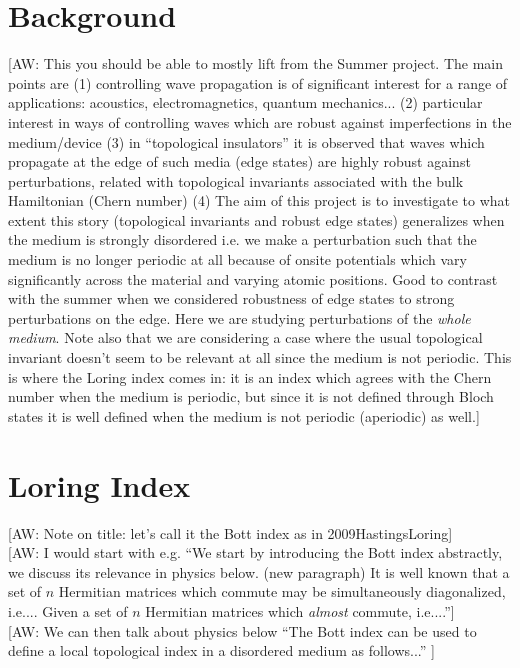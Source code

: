 \documentclass[a4paper]{article}
\newcommand{\aw}[1]{{\color{blue} [AW: #1]}}
\begin{document}
\section{Background}
\aw{This you should be able to mostly lift from the Summer project. The main points are (1) controlling wave propagation is of significant interest for a range of applications: acoustics, electromagnetics, quantum mechanics... (2) particular interest in ways of controlling waves which are robust against imperfections in the medium/device (3) in ``topological insulators'' it is observed that waves which propagate at the edge of such media (edge states) are highly robust against perturbations, related with topological invariants associated with the bulk Hamiltonian (Chern number) (4) The aim of this project is to investigate to what extent this story (topological invariants and robust edge states) generalizes when the medium is strongly disordered i.e. we make a perturbation such that the medium is no longer periodic at all because of onsite potentials which vary significantly across the material and varying atomic positions. Good to contrast with the summer when we considered robustness of edge states to strong perturbations on the edge. Here we are studying perturbations of the \emph{whole medium}. Note also that we are considering a case where the usual topological invariant doesn't seem to be relevant at all since the medium is not periodic. This is where the Loring index comes in: it is an index which agrees with the Chern number when the medium is periodic, but since it is not defined through Bloch states it is well defined when the medium is not periodic (aperiodic) as well.}

\section{Loring Index} \aw{Note on title: let's call it the Bott index as in 2009HastingsLoring} \\

\aw{I would start with e.g. ``We start by introducing the Bott index abstractly, we discuss its relevance in physics below. (new paragraph) It is well known that a set of $n$ Hermitian matrices which commute may be simultaneously diagonalized, i.e.... Given a set of $n$ Hermitian matrices which \emph{almost} commute, i.e....''} \\

\aw{We can then talk about physics below ``The Bott index can be used to define a local topological index in a disordered medium as follows...'' } \\
\end{document}
